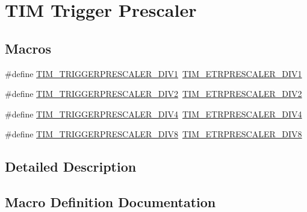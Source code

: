 \hypertarget{group___t_i_m___trigger___prescaler}{}\section{T\+IM Trigger Prescaler}
\label{group___t_i_m___trigger___prescaler}
\subsection*{Macros}
\begin{DoxyCompactItemize}
\item 
\#define \mbox{\hyperlink{group___t_i_m___trigger___prescaler_ga02ab6f24e367cd972a1e0c1df326a7a3}{T\+I\+M\+\_\+\+T\+R\+I\+G\+G\+E\+R\+P\+R\+E\+S\+C\+A\+L\+E\+R\+\_\+\+D\+I\+V1}}~\mbox{\hyperlink{group___t_i_m___e_t_r___prescaler_gabead5364c62645592e42545ba09ab88a}{T\+I\+M\+\_\+\+E\+T\+R\+P\+R\+E\+S\+C\+A\+L\+E\+R\+\_\+\+D\+I\+V1}}
\item 
\#define \mbox{\hyperlink{group___t_i_m___trigger___prescaler_ga1350c5659a17a66df69b444871907d83}{T\+I\+M\+\_\+\+T\+R\+I\+G\+G\+E\+R\+P\+R\+E\+S\+C\+A\+L\+E\+R\+\_\+\+D\+I\+V2}}~\mbox{\hyperlink{group___t_i_m___e_t_r___prescaler_gaf7fe49f67bdb6b33b9b41953fee75680}{T\+I\+M\+\_\+\+E\+T\+R\+P\+R\+E\+S\+C\+A\+L\+E\+R\+\_\+\+D\+I\+V2}}
\item 
\#define \mbox{\hyperlink{group___t_i_m___trigger___prescaler_ga195dd56e15ea4733e19518fb431dfb8d}{T\+I\+M\+\_\+\+T\+R\+I\+G\+G\+E\+R\+P\+R\+E\+S\+C\+A\+L\+E\+R\+\_\+\+D\+I\+V4}}~\mbox{\hyperlink{group___t_i_m___e_t_r___prescaler_gaa09da30c3cd28f1fe6b6f3f599a5212c}{T\+I\+M\+\_\+\+E\+T\+R\+P\+R\+E\+S\+C\+A\+L\+E\+R\+\_\+\+D\+I\+V4}}
\item 
\#define \mbox{\hyperlink{group___t_i_m___trigger___prescaler_ga78edbcf4caf228de0daa4b7f698f578f}{T\+I\+M\+\_\+\+T\+R\+I\+G\+G\+E\+R\+P\+R\+E\+S\+C\+A\+L\+E\+R\+\_\+\+D\+I\+V8}}~\mbox{\hyperlink{group___t_i_m___e_t_r___prescaler_ga834e38200874cced108379b17a24d0b7}{T\+I\+M\+\_\+\+E\+T\+R\+P\+R\+E\+S\+C\+A\+L\+E\+R\+\_\+\+D\+I\+V8}}
\end{DoxyCompactItemize}


\subsection{Detailed Description}


\subsection{Macro Definition Documentation}
\mbox{\label{group___t_i_m___trigger___prescaler_ga02ab6f24e367cd972a1e0c1df326a7a3}} 
